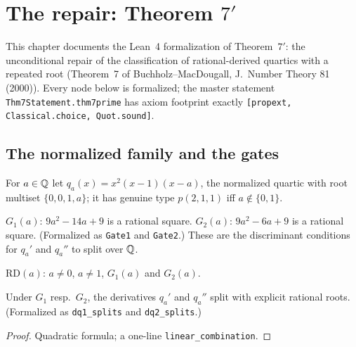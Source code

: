\chapter{The repair: Theorem $7'$}\label{chap:repair}

This chapter documents the Lean~4 formalization of Theorem~$7'$: the
unconditional repair of the classification of rational-derived quartics
with a repeated root (Theorem~7 of Buchholz--MacDougall,
J.~Number Theory 81 (2000)).  Every node below is formalized; the master
statement \texttt{Thm7Statement.thm7prime} has axiom footprint exactly
\texttt{[propext, Classical.choice, Quot.sound]}.

\section{The normalized family and the gates}

\begin{definition}\label{def:family}
\leanok
For $a \in \mathbb{Q}$ let $q_a(x) = x^2(x-1)(x-a)$, the normalized quartic with
root multiset $\{0,0,1,a\}$; it has genuine type $p(2,1,1)$ iff
$a \notin \{0,1\}$.
\end{definition}

\begin{definition}[Gates]\label{def:gates}
\leanok
{}
$G_1(a)$: $9a^2-14a+9$ is a rational square.
$G_2(a)$: $9a^2-6a+9$ is a rational square.
(Formalized as \texttt{Gate1} and \texttt{Gate2}.)  These are the
discriminant conditions for $q_a'$ and $q_a''$ to split over $\mathbb{Q}$.
\end{definition}

\begin{definition}\label{def:rd}
\leanok
{}
$\mathrm{RD}(a)$: $a \neq 0$, $a \neq 1$, $G_1(a)$ and $G_2(a)$.
\end{definition}

\begin{lemma}\label{lem:splits}
\leanok
{}
Under $G_1$ resp.\ $G_2$, the derivatives $q_a'$ and $q_a''$ split with
explicit rational roots.  (Formalized as \texttt{dq1\_splits} and
\texttt{dq2\_splits}.)
\end{lemma}
\begin{proof}\leanok
Quadratic formula; a one-line \texttt{linear\_combination}.
\end{proof}

